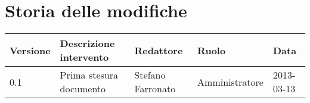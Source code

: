 \newcommand{\docName}{Manuale di installazione}
\newcommand{\docFileName}{manuale_di_installazione}
\newcommand{\docVers}{1.0}
\newcommand{\creationDate}{2013-03-13}
\newcommand{\modificationDate}{2013-03-15}
\newcommand{\docState}{Approvato}
\newcommand{\docUsage}{Esterno}
\newcommand{\docDistributionList}{Installatore del sistema}
\newcommand{\docAuthors}{Stefano Farronato}
\newcommand{\approvedBy}{Andrea Rizzi}
\newcommand{\verifiedBy}{}
\newcommand{\docRoot}{..}
\def\INDICETABELLE{false}
\def\INDICEFIGURE{false}







\section*{Storia delle modifiche}

\begin{tabularx}{\textwidth}{lXlll}
\toprule
Versione & Descrizione intervento & Redattore & Ruolo & Data\\
\midrule %
0.1 & Prima stesura documento & Stefano Farronato & Amministratore & 2013-03-13\\
\bottomrule
\end{tabularx}
\newpage



\setcounter{page}{1}
\pagestyle{normal}

